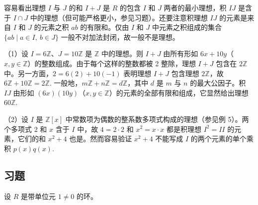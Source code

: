容易看出理想 \(I\) 与 \(J\) 的和 \(I+J\) 是 \(R\) 的包含 \(I\) 和 \(J\) 两者的最小理想，积 \(IJ\) 是含于 \(I \cap J\) 中的理想（但可能严格更小，参见习题）。还要注意积理想 \(IJ\) 的元素是来自 \(I\) 和 \(J\) 的元素之积 \(ab\) 的有限和。仅由 \(I\) 和 \(J\) 中元素之积组成的集合 \(\{ab \mid a \in I,\ b \in J\}\) 一般不对加法封闭，故一般不是理想。

\begin{example}
（1）设 \(I = 6\mathbb{Z}\)、\(J = 10\mathbb{Z}\) 是 \(\mathbb{Z}\) 中的理想。则 \(I+J\) 由所有形如 \(6x+10y\)（\(x, y \in \mathbb{Z}\)）的整数组成。由于每个这样的整数都被 2 整除，理想 \(I+J\) 包含在 \(2\mathbb{Z}\) 中。另一方面，\(2 = 6(2) + 10(-1)\) 表明理想 \(I+J\) 包含理想 \(2\mathbb{Z}\)，故 \(6\mathbb{Z}+10\mathbb{Z} = 2\mathbb{Z}\). 一般地，\(m\mathbb{Z}+n\mathbb{Z} = d\mathbb{Z}\)，其中 \(d\) 是 \(m\) 与 \(n\) 的最大公因子。积 \(IJ\) 由形如 \((6x)(10y)\)（\(x, y \in \mathbb{Z}\)）的元素的全部有限和组成，它显然给出理想 \(60\mathbb{Z}\).

（2）设 \(I\) 是 \(\mathbb{Z}[x]\) 中常数项为偶数的整系数多项式构成的理想（参见例 5）。两个多项式 2 和 \(x\) 含于 \(I\) 中，故 \(4 = 2 \cdot 2\) 和 \(x^2 = x \cdot x\) 都是积理想 \(I^2 = II\) 的元素，它们的和 \(x^2+4\) 也是。然而容易验证 \(x^2+4\) 不能写成 \(I\) 的两个元素的单个乘积 \(p(x)q(x)\).
\end{example}

\subsection*{习题}
设 \(R\) 是带单位元 \(1 \neq 0\) 的环。

